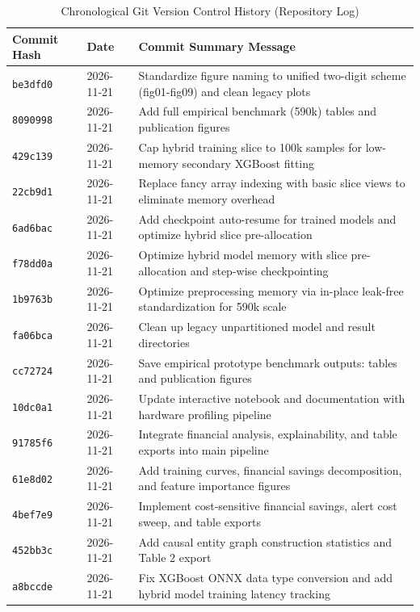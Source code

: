 \documentclass[11pt,a4paper]{report}
\begin{document}
\begin{table}[H]
\centering
\caption{Chronological Git Version Control History (Repository Log)}
\label{tab:git_commits}
\small
\begin{tabular}{lll}
\toprule
\textbf{Commit Hash} & \textbf{Date} & \textbf{Commit Summary Message} \\
\midrule
\texttt{be3dfd0} & 2026-11-21 & Standardize figure naming to unified two-digit scheme (fig01-fig09) and clean legacy plots \\
\texttt{8090998} & 2026-11-21 & Add full empirical benchmark (590k) tables and publication figures \\
\texttt{429c139} & 2026-11-21 & Cap hybrid training slice to 100k samples for low-memory secondary XGBoost fitting \\
\texttt{22cb9d1} & 2026-11-21 & Replace fancy array indexing with basic slice views to eliminate memory overhead \\
\texttt{6ad6bac} & 2026-11-21 & Add checkpoint auto-resume for trained models and optimize hybrid slice pre-allocation \\
\texttt{f78dd0a} & 2026-11-21 & Optimize hybrid model memory with slice pre-allocation and step-wise checkpointing \\
\texttt{1b9763b} & 2026-11-21 & Optimize preprocessing memory via in-place leak-free standardization for 590k scale \\
\texttt{fa06bca} & 2026-11-21 & Clean up legacy unpartitioned model and result directories \\
\texttt{cc72724} & 2026-11-21 & Save empirical prototype benchmark outputs: tables and publication figures \\
\texttt{10dc0a1} & 2026-11-21 & Update interactive notebook and documentation with hardware profiling pipeline \\
\texttt{91785f6} & 2026-11-21 & Integrate financial analysis, explainability, and table exports into main pipeline \\
\texttt{61e8d02} & 2026-11-21 & Add training curves, financial savings decomposition, and feature importance figures \\
\texttt{4bef7e9} & 2026-11-21 & Implement cost-sensitive financial savings, alert cost sweep, and table exports \\
\texttt{452bb3c} & 2026-11-21 & Add causal entity graph construction statistics and Table 2 export \\
\texttt{a8bccde} & 2026-11-21 & Fix XGBoost ONNX data type conversion and add hybrid model training latency tracking \\

\end{tabular}
\end{table}
\end{document}

